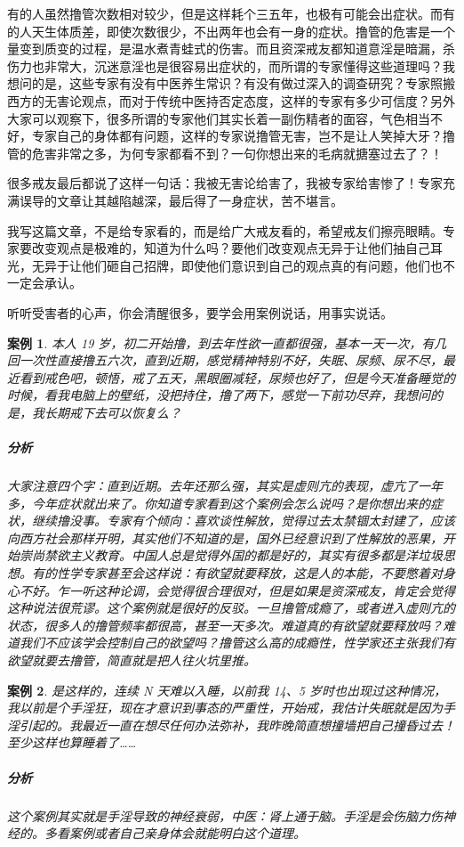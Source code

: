 \documentclass[fontset=founder]{ctexart}
\newtheorem{case}{案例}
\begin{document}
有的人虽然撸管次数相对较少，但是这样耗个三五年，也极有可能会出症状。而有的人天生体质差，即使次数很少，不出两年也会有一身的症状。撸管的危害是一个量变到质变的过程，是温水煮青蛙式的伤害。而且资深戒友都知道意淫是暗漏，杀伤力也非常大，沉迷意淫也是很容易出症状的，而所谓的专家懂得这些道理吗？我想问的是，这些专家有没有中医养生常识？有没有做过深入的调查研究？专家照搬西方的无害论观点，而对于传统中医持否定态度，这样的专家有多少可信度？另外大家可以观察下，很多所谓的专家他们其实长着一副伤精者的面容，气色相当不好，专家自己的身体都有问题，这样的专家说撸管无害，岂不是让人笑掉大牙？撸管的危害非常之多，为何专家都看不到？一句你想出来的毛病就搪塞过去了？！

很多戒友最后都说了这样一句话：我被无害论给害了，我被专家给害惨了！专家充满误导的文章让其越陷越深，最后得了一身症状，苦不堪言。

我写这篇文章，不是给专家看的，而是给广大戒友看的，希望戒友们擦亮眼睛。专家要改变观点是极难的，知道为什么吗？要他们改变观点无异于让他们抽自己耳光，无异于让他们砸自己招牌，即使他们意识到自己的观点真的有问题，他们也不一定会承认。

听听受害者的心声，你会清醒很多，要学会用案例说话，用事实说话。

\begin{case}
    本人 19 岁，初二开始撸，到去年性欲一直都很强，基本一天一次，有几回一次性直接撸五六次，直到近期，感觉精神特别不好，失眠、尿频、尿不尽，最近看到戒色吧，顿悟，戒了五天，黑眼圈减轻，尿频也好了，但是今天准备睡觉的时候，看我电脑上的壁纸，没把持住，撸了两下，感觉一下前功尽弃，我想问的是，我长期戒下去可以恢复么？
    \subparagraph{分析} 大家注意四个字：直到近期。去年还那么强，其实是虚则亢的表现，虚亢了一年多，今年症状就出来了。你知道专家看到这个案例会怎么说吗？是你想出来的症状，继续撸没事。专家有个倾向：喜欢谈性解放，觉得过去太禁锢太封建了，应该向西方社会那样开明，其实他们不知道的是，国外已经意识到了性解放的恶果，开始崇尚禁欲主义教育。中国人总是觉得外国的都是好的，其实有很多都是洋垃圾思想。有的性学专家甚至会这样说：有欲望就要释放，这是人的本能，不要憋着对身心不好。乍一听这种论调，会觉得很合理很对，但是如果是资深戒友，肯定会觉得这种说法很荒谬。这个案例就是很好的反驳。一旦撸管成瘾了，或者进入虚则亢的状态，很多人的撸管频率都很高，甚至一天多次。难道真的有欲望就要释放吗？难道我们不应该学会控制自己的欲望吗？撸管这么高的成瘾性，性学家还主张我们有欲望就要去撸管，简直就是把人往火坑里推。
\end{case}

\begin{case}
    是这样的，连续 N 天难以入睡，以前我 14、5 岁时也出现过这种情况，我以前是个手淫狂，现在才意识到事态的严重性，开始戒，我估计失眠就是因为手淫引起的。我最近一直在想尽任何办法弥补，我昨晚简直想撞墙把自己撞昏过去！至少这样也算睡着了……
    \subparagraph{分析} 这个案例其实就是手淫导致的神经衰弱，中医：肾上通于脑。手淫是会伤脑力伤神经的。多看案例或者自己亲身体会就能明白这个道理。
\end{case}
\end{document}
